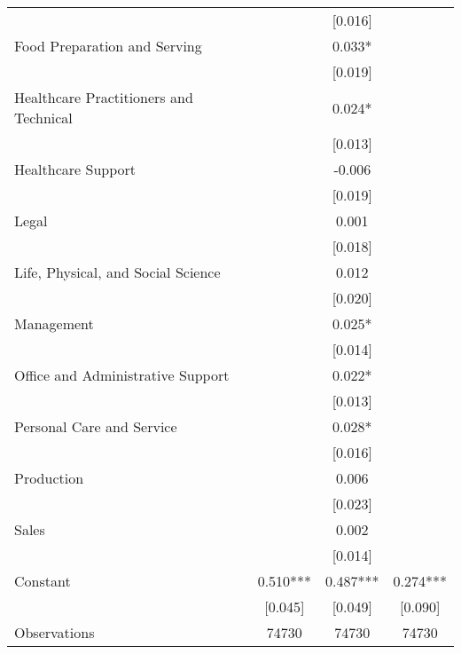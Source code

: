 \documentclass[a4paper, 12 pt]{article}
\theoremstyle{plain}
\begin{document}
\begin{doublespace}
\begin{table}[htbp]
{\begin{tabular}{l*{3}{c}}
                    &               &     [0.016]   &               \\
Food Preparation and Serving &               &       0.033*  &               \\
                    &               &     [0.019]   &               \\
Healthcare Practitioners and Technical &               &       0.024*  &               \\
                    &               &     [0.013]   &               \\
Healthcare Support &               &      -0.006   &               \\
                    &               &     [0.019]   &               \\
Legal &               &       0.001   &               \\
                    &               &     [0.018]   &               \\
Life, Physical, and Social Science &               &       0.012   &               \\
                    &               &     [0.020]   &               \\
Management &               &       0.025*  &               \\
                    &               &     [0.014]   &               \\
Office and Administrative Support &               &       0.022*  &               \\
                    &               &     [0.013]   &               \\
Personal Care and Service &               &       0.028*  &               \\
                    &               &     [0.016]   &               \\
Production &               &       0.006   &               \\
                    &               &     [0.023]   &               \\
Sales &               &       0.002   &               \\
                    &               &     [0.014]   &               \\
Constant            &       0.510***&       0.487***&       0.274***\\
                    &     [0.045]   &     [0.049]   &     [0.090]   \\
\midrule
Observations        &       74730   &       74730   &       74730   \\

\end{tabular}}
\end{table}
\end{doublespace}
\end{document}
